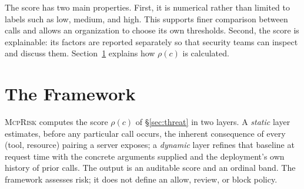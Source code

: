 \documentclass[sigconf]{acmart}
\newcommand{\framework}{\textsc{McpRisk}}
\begin{document}
The score has two main properties. First, it is numerical rather than limited
to labels such as low, medium, and high. This supports finer comparison between
calls and allows an organization to choose its own thresholds. Second, the
score is explainable: its factors are reported separately so that security
teams can inspect and discuss them. Section~\ref{sec:framework} explains how
$\rho(c)$ is calculated.
%
%
%
%
%
%
%
\section{The Framework}
\label{sec:framework}

\framework{} computes the score $\rho(c)$ of \S\ref{sec:threat} in two layers.
A \emph{static} layer estimates, before any particular call occurs, the
inherent consequence of every (tool, resource) pairing a server exposes; a
\emph{dynamic} layer refines that baseline at request time with the concrete
arguments supplied and the deployment's own history of prior calls. The output is an
auditable score and an ordinal band. The framework assesses risk; it does not
define an allow, review, or block policy.
\end{document}
